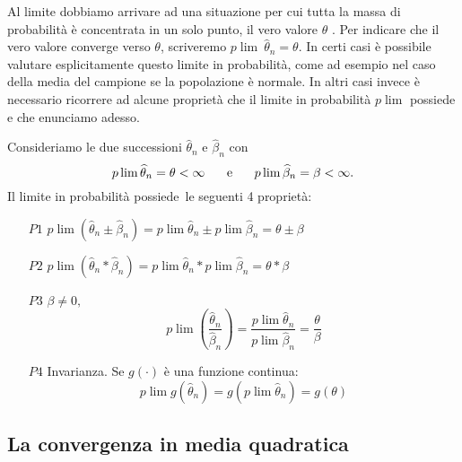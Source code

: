 \documentclass[a4paper]{report}
\newcounter{ese}
\theoremstyle{remark}
\begin{document}
Al limite dobbiamo arrivare ad una situazione per cui tutta la massa di
probabilit\`{a} \`{e} concentrata in un solo punto, il vero valore $\theta $%
. Per indicare che il vero valore converge verso $\theta $, scriveremo $%
p\lim \ \hat{\theta}_{n}=\theta $. In certi casi \`{e} possibile valutare
esplicitamente questo limite in probabilit\`{a}, come ad esempio nel caso
della media del campione se la popolazione \`{e} normale. In altri casi
invece \`{e} necessario ricorrere ad alcune propriet\`{a} che il limite in
probabilit\`{a} $p\lim $ possiede e che enunciamo adesso.

\noindent Consideriamo le due successioni $\widehat{\theta }_{n}$ e $%
\widehat{\beta }_{n}$ con 
\begin{equation*}
p\lim \widehat{\theta }_{n}=\theta <\infty \hspace{0.5cm}\text{ e }\hspace{%
0.5cm}p\lim \widehat{\beta }_{n}=\beta <\infty .
\end{equation*}%
Il limite in probabilit\`{a} possiede\ le seguenti 4 propriet\`{a}:

\begin{enumerate}
\item[$P1$] $p\lim \left( \widehat{\theta }_{n}\pm \widehat{\beta }%
_{n}\right) =p\lim \widehat{\theta }_{n}\pm p\lim \widehat{\beta }%
_{n}=\theta \pm \beta $

\item[$P2$] $p\lim \left( \widehat{\theta }_{n}\ast \widehat{\beta }%
_{n}\right) =p\lim \widehat{\theta }_{n}\ast p\lim \widehat{\beta }%
_{n}=\theta \ast \beta $

\item[$P3$] $\beta \neq 0,$%
\begin{equation*}
p\lim \left( \frac{\widehat{\theta }_{n}}{\widehat{\beta }_{n}}\right) =%
\frac{p\lim \widehat{\theta }_{n}}{p\lim \widehat{\beta }_{n}}=\frac{\theta 
}{\beta }
\end{equation*}

\item[$P4$] Invarianza. Se $g\left( \cdot \right) $ \`{e} una funzione
continua:%
\begin{equation*}
p\lim g\left( \widehat{\theta }_{n}\right) =g\left( p\lim \widehat{\theta }%
_{n}\right) =g\left( \theta \right)
\end{equation*}
\end{enumerate}

\subsection{La convergenza in media quadratica}
\end{document}
